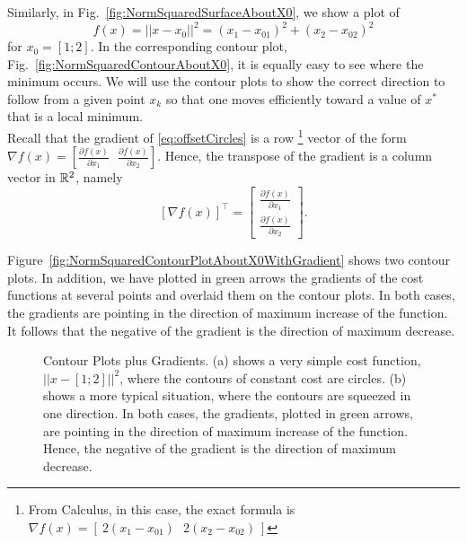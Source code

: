 Similarly, in Fig.~\ref{fig:NormSquaredSurfaceAboutX0}, we show a plot of 
\begin{equation}
    \label{eq:offsetCircles}
    f(x)=||x-x_0||^2=(x_1-x_{01})^2 + (x_2-x_{02})^2
\end{equation}
for $x_0=[1; 2]$. In the corresponding contour plot, Fig.~\ref{fig:NormSquaredContourAboutX0}, it is equally easy to see where the minimum occurs. We will use the contour plots to show the correct direction to follow from a given point $x_k$ so that one moves efficiently toward a value of $x^\ast$ that is a local minimum.\\


Recall that the gradient of \eqref{eq:offsetCircles} is a row
\footnote{From Calculus, in this case, the exact formula is $\nabla f(x) = \left[~ 2(x_1-x_{01}) ~~~  2(x_2-x_{02})~\right]$} vector of the form $\nabla f(x)= \left[ \frac{\partial f(x)}{\partial x_1} ~~~ \frac{\partial f(x)}{\partial x_2}\right]$. Hence, the transpose of the gradient is a column vector in $\mathbb R^2$, namely
\begin{equation}
    \label{eq:GradientOffsetCircles}
    \left[ \nabla f(x) \right]^\top = \left[ \begin{array}{c} \frac{\partial f(x)}{\partial x_1} \\ \frac{\partial f(x)}{\partial x_2} \end{array} \right].
\end{equation}

Figure~\ref{fig:NormSquaredContourPlotAboutX0WithGradient} shows two contour plots. In addition, we have plotted in green arrows the gradients of the cost functions at several points and overlaid them on the contour plots. In both cases, the gradients are pointing in the direction of maximum increase of the function. It follows that the negative of the gradient is the direction of maximum decrease.


\begin{figure}[htb]%
\centering
{}
\hspace{5pt}%
%
\caption[]{Contour Plots plus Gradients. (a) shows a very simple cost function, $||x-[1;2]||^2$, where the contours of constant cost are circles. (b) shows a more typical situation, where the contours are squeezed in one direction. In both cases, the gradients, plotted in green arrows, are pointing in the direction of maximum increase of the function. Hence, the negative of the gradient is the direction of maximum decrease. }
    \label{fig:ContourPlotsDerivatives}
\end{figure}

